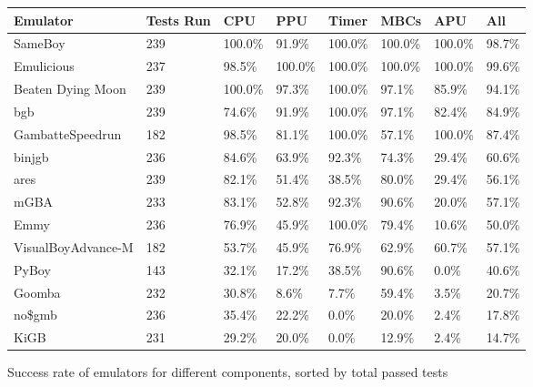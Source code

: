 \documentclass[11pt]{informatics-report}
\begin{document}
\begin{figure}[h]
    \centering
    \begin{tabular}{|l|l|l|l|l|l|l|l|}
    \hline
    \textbf{Emulator} & \textbf{Tests Run} & \textbf{CPU} & \textbf{PPU} & \textbf{Timer} & \textbf{MBCs} & \textbf{APU} & \textbf{All} \\ \hline

	SameBoy & 239 & 100.0\% & 91.9\% & 100.0\% & 100.0\% & 100.0\% & 98.7\% \\
	Emulicious & 237 & 98.5\% & 100.0\% & 100.0\% & 100.0\% & 100.0\% & 99.6\% \\
	Beaten Dying Moon & 239 & 100.0\% & 97.3\% & 100.0\% & 97.1\% & 85.9\% & 94.1\% \\
	bgb & 239 & 74.6\% & 91.9\% & 100.0\% & 97.1\% & 82.4\% & 84.9\% \\
	GambatteSpeedrun & 182 & 98.5\% & 81.1\% & 100.0\% & 57.1\% & 100.0\% & 87.4\% \\
	binjgb & 236 & 84.6\% & 63.9\% & 92.3\% & 74.3\% & 29.4\% & 60.6\% \\
	ares & 239 & 82.1\% & 51.4\% & 38.5\% & 80.0\% & 29.4\% & 56.1\% \\
	mGBA & 233 & 83.1\% & 52.8\% & 92.3\% & 90.6\% & 20.0\% & 57.1\% \\

	\hline
	Emmy & 236 & 76.9\% & 45.9\% & 100.0\% & 79.4\% & 10.6\% & 50.0\% \\
	\hline

	VisualBoyAdvance-M & 182 & 53.7\% & 45.9\% & 76.9\% & 62.9\% & 60.7\% & 57.1\% \\
	PyBoy & 143 & 32.1\% & 17.2\% & 38.5\% & 90.6\% & 0.0\% & 40.6\% \\
	Goomba & 232 & 30.8\% & 8.6\% & 7.7\% & 59.4\% & 3.5\% & 20.7\% \\
	no\$gmb & 236 & 35.4\% & 22.2\% & 0.0\% & 20.0\% & 2.4\% & 17.8\% \\
	KiGB & 231 & 29.2\% & 20.0\% & 0.0\% & 12.9\% & 2.4\% & 14.7\% \\\hline

    \end{tabular}
    \caption{Success rate of emulators for different components, sorted by total passed tests}
    \label{fig:stats-tests-relative}
\end{figure}
\end{document}

